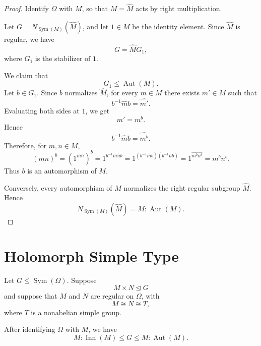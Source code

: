 \begin{proof}
Identify \(\Omega\) with \(M\), so that \(M=\widehat M\) acts by right
multiplication.

Let \(G=N_{\operatorname{Sym}(M)}(\widehat M)\), and let \(1\in M\) be the
identity element. Since \(\widehat M\) is regular, we have
\[
    G=\widehat M G_1,
\]
where \(G_1\) is the stabilizer of \(1\).

We claim that
\[
    G_1\leq \operatorname{Aut}(M).
\]
Let \(b\in G_1\). Since \(b\) normalizes \(\widehat M\), for every \(m\in M\)
there exists \(m'\in M\) such that
\[
    b^{-1}\widehat m b=\widehat{m'}.
\]
Evaluating both sides at \(1\), we get
\[
    m'=m^b.
\]
Hence
\[
    b^{-1}\widehat m b=\widehat{m^b}.
\]
Therefore, for \(m,n\in M\),
\[
    (mn)^b
    =
    \left(1^{\widehat m\widehat n}\right)^b
    =
    1^{b^{-1}\widehat m\widehat n b}
    =
    1^{(b^{-1}\widehat m b)(b^{-1}\widehat n b)}
    =
    1^{\widehat{m^b}\widehat{n^b}}
    =
    m^b n^b.
\]
Thus \(b\) is an automorphism of \(M\).

Conversely, every automorphism of \(M\) normalizes the right regular subgroup
\(\widehat M\). Hence
\[
    N_{\operatorname{Sym}(M)}(\widehat M)
    =
    \widehat M:\operatorname{Aut}(M).
\]
\end{proof}

\section{Holomorph Simple Type}

\begin{theorem}
Let \(G\leq \operatorname{Sym}(\Omega)\). Suppose
\[
    M\times N\unlhd G
\]
and suppose that \(M\) and \(N\) are regular on \(\Omega\), with
\[
    M\cong N\cong T,
\]
where \(T\) is a nonabelian simple group.

After identifying \(\Omega\) with \(M\), we have
\[
    M:\operatorname{Inn}(M)
    \leq
    G
    \leq
    M:\operatorname{Aut}(M).
\]
\end{theorem}

